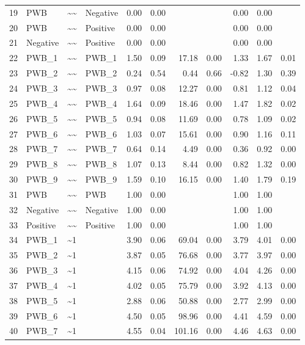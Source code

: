 \documentclass{article}
\begin{document}
\begin{table}[ht]
\begin{tabular}{rlllrrrrrrr}
  19 & PWB & \~{}\~{} & Negative & 0.00 & 0.00 &  &  & 0.00 & 0.00 &  \\ 
  20 & PWB & \~{}\~{} & Positive & 0.00 & 0.00 &  &  & 0.00 & 0.00 &  \\ 
  21 & Negative & \~{}\~{} & Positive & 0.00 & 0.00 &  &  & 0.00 & 0.00 &  \\ 
  22 & PWB\_1 & \~{}\~{} & PWB\_1 & 1.50 & 0.09 & 17.18 & 0.00 & 1.33 & 1.67 & 0.01 \\ 
  23 & PWB\_2 & \~{}\~{} & PWB\_2 & 0.24 & 0.54 & 0.44 & 0.66 & -0.82 & 1.30 & 0.39 \\ 
  24 & PWB\_3 & \~{}\~{} & PWB\_3 & 0.97 & 0.08 & 12.27 & 0.00 & 0.81 & 1.12 & 0.04 \\ 
  25 & PWB\_4 & \~{}\~{} & PWB\_4 & 1.64 & 0.09 & 18.46 & 0.00 & 1.47 & 1.82 & 0.02 \\ 
  26 & PWB\_5 & \~{}\~{} & PWB\_5 & 0.94 & 0.08 & 11.69 & 0.00 & 0.78 & 1.09 & 0.02 \\ 
  27 & PWB\_6 & \~{}\~{} & PWB\_6 & 1.03 & 0.07 & 15.61 & 0.00 & 0.90 & 1.16 & 0.11 \\ 
  28 & PWB\_7 & \~{}\~{} & PWB\_7 & 0.64 & 0.14 & 4.49 & 0.00 & 0.36 & 0.92 & 0.00 \\ 
  29 & PWB\_8 & \~{}\~{} & PWB\_8 & 1.07 & 0.13 & 8.44 & 0.00 & 0.82 & 1.32 & 0.00 \\ 
  30 & PWB\_9 & \~{}\~{} & PWB\_9 & 1.59 & 0.10 & 16.15 & 0.00 & 1.40 & 1.79 & 0.19 \\ 
  31 & PWB & \~{}\~{} & PWB & 1.00 & 0.00 &  &  & 1.00 & 1.00 &  \\ 
  32 & Negative & \~{}\~{} & Negative & 1.00 & 0.00 &  &  & 1.00 & 1.00 &  \\ 
  33 & Positive & \~{}\~{} & Positive & 1.00 & 0.00 &  &  & 1.00 & 1.00 &  \\ 
  34 & PWB\_1 & \~{}1 &  & 3.90 & 0.06 & 69.04 & 0.00 & 3.79 & 4.01 & 0.00 \\ 
  35 & PWB\_2 & \~{}1 &  & 3.87 & 0.05 & 76.68 & 0.00 & 3.77 & 3.97 & 0.00 \\ 
  36 & PWB\_3 & \~{}1 &  & 4.15 & 0.06 & 74.92 & 0.00 & 4.04 & 4.26 & 0.00 \\ 
  37 & PWB\_4 & \~{}1 &  & 4.02 & 0.05 & 75.79 & 0.00 & 3.92 & 4.13 & 0.00 \\ 
  38 & PWB\_5 & \~{}1 &  & 2.88 & 0.06 & 50.88 & 0.00 & 2.77 & 2.99 & 0.00 \\ 
  39 & PWB\_6 & \~{}1 &  & 4.50 & 0.05 & 98.96 & 0.00 & 4.41 & 4.59 & 0.00 \\ 
  40 & PWB\_7 & \~{}1 &  & 4.55 & 0.04 & 101.16 & 0.00 & 4.46 & 4.63 & 0.00 \\ 

\end{tabular}
\end{table}
\end{document}

